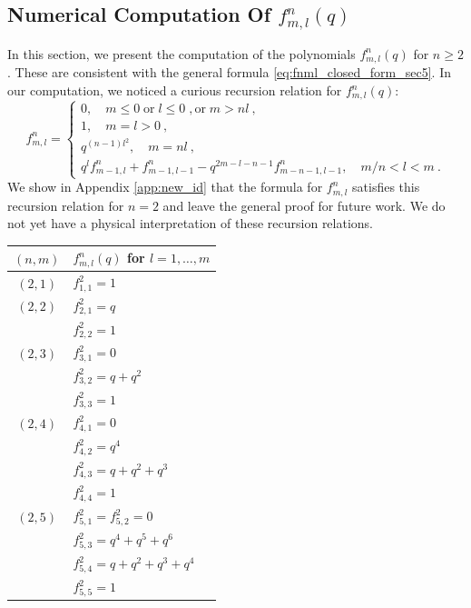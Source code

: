 \documentclass[a4paper,10pt]{article}
\begin{document}
\begin{appendix}
\section{Numerical Computation Of $f^n_{m,l}(q)$}\label{app:data_fmnl}
In this section, we present the computation of the polynomials $f^n_{m,l}(q)$ for $n\geq 2$. These are consistent with the general formula \eqref{eq:fnml_closed_form_sec5}. 
In our computation, we noticed a curious recursion relation for 
 $f^n_{m,l}(q)$:
 \begin{equation}\label{eq:rec_fnml}
     f^{n}_{m,l} = \begin{cases}
         0, \quad m \leq 0\; \text{or}\; l \leq 0\;, \text{or}\; m > n l~,\\
         1,\quad m=l> 0~, \\
         q^{(n-1) l^2}, \quad m = n l~,\\
         q^l f^{n}_{m-1,l} + f^{n}_{m-1,l-1}-q^{2m-l-n-1} f^{n}_{m-n-1,l-1}, \quad m/n< l < m~.
     \end{cases}
 \end{equation}
We show in Appendix \ref{app:new_id} that the formula for $f^n_{m,l}$ satisfies this recursion relation for $n=2$ and leave the general proof for future work. We do not yet have a physical interpretation of these recursion relations. 
\begin{table}[H]
    \centering
    \begin{tabular}{|c|l|}
\hline
$(n,m)$ & $f^n_{m,l}(q)$ for $l=1,\dots,m$
\\
\hline
$(2,1)$ & 
$f^2_{1,1} = 1$ \\
\hline
$(2,2)$ & 
$f^2_{2,1} = q$ \\
        & $f^2_{2,2} = 1$ \\
\hline
$(2,3)$ & 
$f^2_{3,1} = 0$ \\
        & $f^2_{3,2} = q + q^2$ \\
        & $f^2_{3,3} = 1$ \\
\hline
$(2,4)$ & 
$f^2_{4,1} = 0$ \\
        & $f^2_{4,2} = q^4$ \\
        & $f^2_{4,3} = q + q^2 + q^3$ \\
        & $f^2_{4,4} = 1$ \\
\hline
$(2,5)$ & 
$f^2_{5,1} = f^2_{5,2} = 0$ \\
        & $f^2_{5,3} = q^4 + q^5 + q^6$ \\
        & $f^2_{5,4} = q + q^2 + q^3 + q^4$ \\
        & $f^2_{5,5} = 1$ \\

\end{tabular}
\end{table}
\end{appendix}
\end{document}
